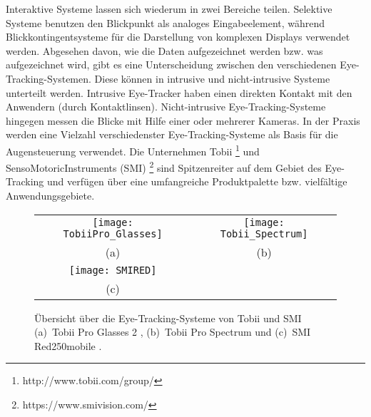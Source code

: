 \newline \newline
Interaktive Systeme lassen sich wiederum in zwei Bereiche teilen. Selektive Systeme benutzen den Blickpunkt als analoges Eingabeelement, während \mbox{Blickkontingentsysteme} für die Darstellung von komplexen Displays verwendet werden. 
\newline \newline
Abgesehen davon, wie die Daten aufgezeichnet werden bzw. was aufgezeichnet wird, gibt es eine Unterscheidung zwischen den verschiedenen Eye-Tracking-Systemen. \mbox{Diese} können in intrusive und nicht-intrusive Systeme unterteilt werden. Intrusive Eye-Tracker haben einen direkten Kontakt mit den Anwendern (\zB durch Kontaktlinsen). Nicht-intrusive Eye-Tracking-Systeme hingegen messen die Blicke mit Hilfe einer oder \mbox{mehrerer} Kameras. 
\newline \newline
In der Praxis werden eine Vielzahl verschiedenster Eye-Tracking-Systeme als Basis für die Augensteuerung verwendet. Die Unternehmen Tobii%
\footnote{http://www.tobii.com/group/}
%
und SensoMotoricInstruments (SMI)%
\footnote{https://www.smivision.com/}
%
sind Spitzenreiter auf dem Gebiet des Eye-Tracking und verfügen über eine umfangreiche Produktpalette bzw. vielfältige Anwendungsgebiete. 
\begin{figure}
\centering\small
\setlength{\tabcolsep}{0mm}	%
\begin{tabular}{c@{\hspace{-15mm}}c} %
  \texttt{[image: TobiiPro\_Glasses]} &
  \texttt{[image: Tobii\_Spectrum]}
\\
  (a) & (b)
\\[4pt]	%
  \texttt{[image: SMIRED]}
\\
  (c)
\end{tabular}
%
\caption{Übersicht über die Eye-Tracking-Systeme von Tobii und SMI \newline
(a)~Tobii Pro Glasses 2 \cite{TobiiGlasses}, (b)~Tobii Pro Spectrum \cite{TobiiSpectrum} und (c)~SMI Red250mobile \cite{SMIRED}.}
\label{fig:Tobii}
\end{figure}
\newline \newline
